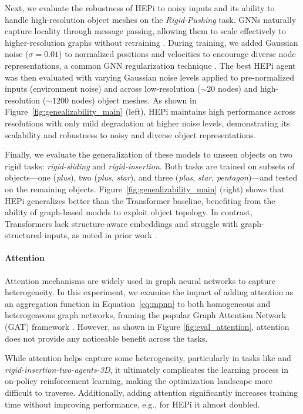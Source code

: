 Next, we evaluate the robustness of HEPi to noisy inputs and its ability to handle high-resolution object meshes on the \emph{Rigid-Pushing} task. GNNs naturally capture locality through message passing, allowing them to scale effectively to higher-resolution graphs without retraining \citep{li2020multipole, freymuth2023swarm}. During training, we added Gaussian noise ($\sigma=0.01$) to normalized positions and velocities to encourage diverse node representations, a common GNN regularization technique \citep{godwin2022simple}. The best HEPi agent was then evaluated with varying Gaussian noise levels applied to pre-normalized inputs (environment noise) and across low-resolution (\(\sim20\) nodes) and high-resolution (\(\sim1200\) nodes) object meshes. As shown in Figure~\ref{fig:genealizability_main} (left), HEPi maintains high performance across resolutions with only mild degradation at higher noise levels, demonstrating its scalability and robustness to noisy and diverse object representations.

Finally, we evaluate the generalization of these models to unseen objects on two rigid tasks: \emph{rigid-sliding} and \emph{rigid-insertion}. Both tasks are trained on subsets of objects—one (\textit{plus}), two (\textit{plus}, \textit{star}), and three (\textit{plus}, \textit{star}, \textit{pentagon})—and tested on the remaining objects. Figure~\ref{fig:genealizability_main} (right) shows that HEPi generalizes better than the Transformer baseline, benefiting from the ability of graph-based models to exploit object topology. In contrast, Transformers lack structure-aware embeddings and struggle with graph-structured inputs, as noted in prior work \citep{hong2022structureaware}.

\paragraph{Attention}



Attention mechanisms are widely used in graph neural networks to capture heterogeneity. In this experiment, we examine the impact of adding attention as an aggregation function in Equation~\ref{eq:mpnn} to both homogeneous and heterogeneous graph networks, framing the popular Graph Attention Network (GAT) framework \citep{gat}. However, as shown in Figure \ref{fig:eval_attention}, attention does not provide any noticeable benefit across the tasks. 

While attention helps capture some heterogeneity, particularly in tasks like  and \textit{rigid-insertion-two-agents-3D}, it ultimately complicates the learning process in on-policy reinforcement learning, making the optimization landscape more difficult to traverse. Additionally, adding attention significantly increases training time without improving performance, e.g., for HEPi it almost doubled.

